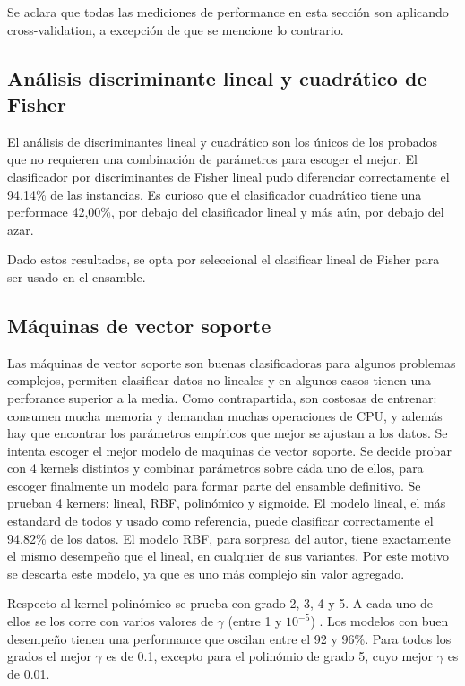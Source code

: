 \documentclass[journal]{IEEEtran}
\begin{document}
Se aclara que todas las mediciones de performance en esta
sección son aplicando cross-validation, a excepción de que se mencione lo
contrario.

\subsection{Análisis discriminante lineal y cuadrático de Fisher}
El análisis de discriminantes lineal y cuadrático son los únicos de los probados
que no requieren una combinación de parámetros para escoger el mejor. El
clasificador por discriminantes de Fisher lineal pudo diferenciar correctamente
el 94,14\% de las instancias. Es curioso que el clasificador cuadrático tiene
una performace 42,00\%, por debajo del clasificador lineal y más aún, por debajo
del azar. 

Dado estos resultados, se opta por seleccional el clasificar lineal de Fisher
para ser usado en el ensamble.

\subsection{Máquinas de vector soporte}
Las máquinas de vector soporte son buenas clasificadoras para algunos problemas complejos, permiten
clasificar datos no lineales y en algunos casos tienen una perforance superior a la media.
Como contrapartida, son costosas de entrenar: consumen mucha  memoria y
demandan muchas operaciones de CPU, y además hay que encontrar
los parámetros empíricos que mejor se ajustan a los datos.  
Se intenta escoger el mejor modelo de maquinas de vector soporte. Se
decide probar con 4 kernels distintos y combinar parámetros sobre
cáda uno de ellos, para escoger finalmente un modelo para formar parte
del ensamble definitivo. Se prueban 4 kerners: lineal, RBF, polinómico y
sigmoide. El modelo lineal, el más estandard de todos y usado como referencia,
puede clasificar correctamente el 94.82\% de los datos. El modelo RBF, para
sorpresa del autor, tiene exactamente el mismo desempeño que el lineal, 
en cualquier de sus variantes. Por este motivo se descarta este modelo,
ya que es uno más complejo sin valor agregado. 

Respecto al kernel polinómico se prueba con grado 2, 3, 4 y 5. A cada
uno de ellos se los corre con varios valores de $\gamma$ (entre 1 y $10^{-5}$) . Los modelos
con buen desempeño tienen una performance que oscilan entre el 92 y
96\%. Para todos los grados el mejor $\gamma$ es de 0.1, excepto para el polinómio
de grado 5, cuyo mejor $\gamma$ es de 0.01. 
\end{document}
